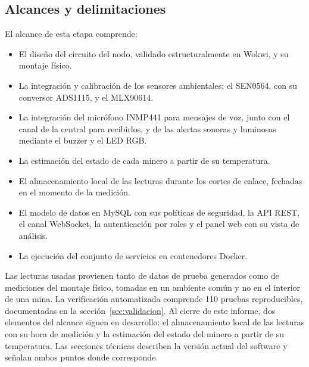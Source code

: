 \documentclass[10pt,a4paper]{article}
\begin{document}
\subsection{Alcances y delimitaciones}
\label{sec:alcances}
El alcance de esta etapa comprende:
\begin{itemize}
\item El diseño del circuito del nodo, validado estructuralmente en Wokwi, y su montaje físico.
\item La integración y calibración de los sensores ambientales: el SEN0564, con su conversor ADS1115, y el MLX90614.
\item La integración del micrófono INMP441 para mensajes de voz, junto con el canal de la central para recibirlos, y de las alertas sonoras y luminosas mediante el buzzer y el LED RGB.
\item La estimación del estado de cada minero a partir de su temperatura.
\item El almacenamiento local de las lecturas durante los cortes de enlace, fechadas en el momento de la medición.
\item El modelo de datos en MySQL con sus políticas de seguridad, la API REST, el canal WebSocket, la autenticación por roles y el panel web con su vista de análisis.
\item La ejecución del conjunto de servicios en contenedores Docker.
\end{itemize}
Las lecturas usadas provienen tanto de datos de prueba generados como de mediciones del montaje físico, tomadas en un ambiente común y no en el interior de una mina. La verificación automatizada comprende 110 pruebas reproducibles, documentadas en la sección~\ref{sec:validacion}. Al cierre de este informe, dos elementos del alcance siguen en desarrollo: el almacenamiento local de las lecturas con su hora de medición y la estimación del estado del minero a partir de su temperatura. Las secciones técnicas describen la versión actual del software y señalan ambos puntos donde corresponde.
\end{document}
